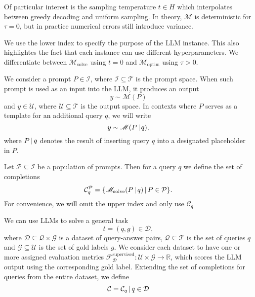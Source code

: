 Of particular interest is the sampling temperature $t \in H$ which interpolates between greedy decoding and uniform sampling.
In theory, $\mathscr{M}$ is deterministic for $\tau=0$, but in practice numerical errors still introduce variance.

We use the lower index to specify the purpose of the LLM instance. This also highlightes
the fact that each instance can use different hyperparameters. We differentiate between $\mathscr{M}_{\text{solve}}$ using $t=0$ and 
$\mathscr{M}_{\text{optim}}$ using $\tau>0$. 

We consider a prompt $P \in \mathcal{I}$, where $\mathcal{I} \subseteq \mathcal{T}$ is the prompt space.
When such prompt is used as an input into the LLM, it produces an output
\begin{equation}
    y \sim \mathscr{M}(P)
\end{equation}
and $y \in \mathcal{U}$, where
$\mathcal{U} \subseteq \mathcal{T}$ is the output space.
In contexts where $P$ serves as a template for an additional query $q$, we will write
\begin{equation}
    y \sim \mathscr{M}(P\, \vert \, q),
\end{equation}
where $P \, \vert \, q$ denotes the result of inserting query $q$ into a designated placeholder in $P$.

Let $\mathcal{P} \subseteq \mathcal{I}$ be a population of prompts. Then for a query $q$ we define the set of completions 
\begin{equation}
    \mathcal{C}_{q}^{\mathcal{P}} = \{\mathscr{M}_{\text{solve}}(P\, \vert \, q)\, \vert \, P \in \mathcal{P}\}.
\end{equation}
For convenience, we will omit the upper index and only use $\mathcal{C}_{q}$

We can use LLMs to solve a general task
\begin{equation}
    t = (q, g) \in \mathcal{D},
\end{equation}
where $\mathcal{D} \subseteq \mathcal{Q} \times \mathcal{G}$ is a dataset of query-answer pairs, $\mathcal{Q}\subseteq\mathcal{T}$ is the set of queries $q$
and $\mathcal{G}\subseteq\mathcal{U}$ is the set of gold labels $g$.
We consider each dataset to have one or more assigned evaluation metrics $\mathscr{F}_{\mathcal{D}}^{\text{supervised}}: \mathcal{U} \times \mathcal{G} \rightarrow \mathbb{R}$,
which scores the LLM output using the corresponding gold label. 
Extending the set of completions for queries from the entire dataset, we define
\begin{equation}
    \mathcal{C} = {\mathcal{C}_{q}\, \vert \, q \in \mathcal{D}}
\end{equation}

